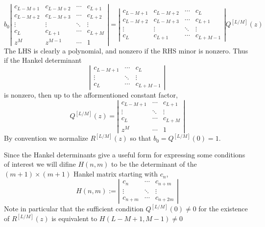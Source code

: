 \[
  b_0
  \left|
  \begin{matrix}
    c_{L-M+1} & c_{L-M+2} & \cdots & c_{L+1} \\
    c_{L-M+2} & c_{L-M+3} & \cdots & c_{L+2} \\
    \vdots & \vdots & \ddots & \vdots \\
    c_{L} & c_{L+1} & \cdots & c_{L+M} \\
    z^M & z^{M-1} & \cdots & 1
  \end{matrix}
  \right|
  =
  \left|
  \begin{matrix}
    c_{L-M+1} & c_{L-M+2} & \cdots & c_L \\
    c_{L-M+2} & c_{L-M+3} & \cdots & c_{L+1} \\
    \vdots & \vdots & \ddots & \vdots  \\
    c_L & c_{L+1} & \cdots & c_{L+M-1} 
  \end{matrix}
  \right| 
  Q^{[L/M]}(z)
\]
The LHS is clearly a polynomial, and nonzero if the RHS minor is nonzero. Thus if the Hankel determinant
\[
  \left|
  \begin{matrix}
    c_{L-M+1} & \cdots & c_L \\
    \vdots & \ddots & \vdots  \\
    c_L & \cdots & c_{L+M-1} 
  \end{matrix}
  \right| 
\]
is nonzero, then up to the afformentioned constant factor,
\begin{equation}
  Q^{[L/M]}(z) = 
  \left|
  \begin{matrix}
    c_{L-M+1} & \cdots & c_{L+1} \\
    \vdots & \ddots & \vdots \\
    c_{L} & \cdots & c_{L+M} \\
    z^M & \cdots & 1
  \end{matrix}
  \right| 
  \label{eq:Qdet}
\end{equation}
By convention we normalize $R^{[L/M]}(z)$ so that $b_0 = Q^{[L/M]}(0) = 1$. 

Since the Hankel determinants give a useful form for expressing some conditions of interest we will difine $H(n,m)$ to be the determinant of the $(m + 1) \times (m + 1)$ Hankel matrix starting with $c_n$,
\[
  H(n,m) :=
  \left|
  \begin{matrix}
    c_{n} & \cdots & c_{n+m} \\
    \vdots & \ddots & \vdots  \\
    c_{n+m} & \cdots & c_{n+2m} 
  \end{matrix}
  \right|
\]
Note in particular that the sufficient condition $Q^{[L/M]}(0) \neq 0$ for the existence of $R^{[L/M]}(z)$ is equivalent to $H(L-M+1, M-1) \neq 0$

